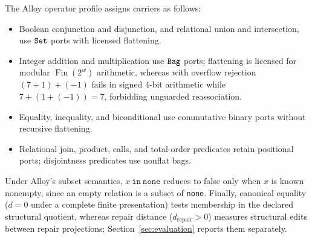 The Alloy operator profile assigns carriers as follows:
\begin{itemize}
\item Boolean conjunction and disjunction, and relational union and
  intersection, use $\texttt{Set}$ ports with licensed flattening.
\item Integer addition and multiplication use $\texttt{Bag}$ ports; flattening is
  licensed for modular $\operatorname{Fin}(2^w)$ arithmetic, whereas with
  overflow rejection $(7+1)+(-1)$ fails in signed 4-bit arithmetic while
  $7+(1+(-1))=7$, forbidding unguarded reassociation.
\item Equality, inequality, and biconditional use commutative binary ports
  without recursive flattening.
\item Relational join, product, calls, and total-order predicates retain
  positional ports; disjointness predicates use nonflat bags.
\end{itemize}
Under Alloy's subset semantics, $x\ \texttt{in}\ \texttt{none}$ reduces to false
only when $x$ is known nonempty, since an empty relation is a subset of
\texttt{none}. Finally, canonical equality ($d=0$ under a complete finite
presentation) tests membership in the declared structural quotient, whereas
repair distance ($d_{\mathrm{repair}}>0$) measures structural edits between
repair projections; Section~\ref{sec:evaluation} reports them separately.
